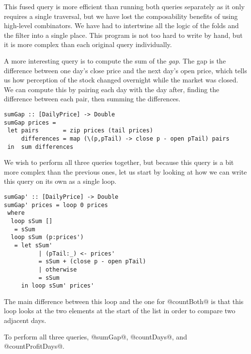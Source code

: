 This fused query is more efficient than running both queries separately as it only requires a single traversal, but we have lost the composability benefits of using high-level combinators.
We have had to intertwine all the logic of the folds and the filter into a single place.
This program is not too hard to write by hand, but it is more complex than each original query individually.

A more interesting query is to compute the sum of the \emph{gap}.
The gap is the difference between one day's close price and the next day's open price, which tells us how perception of the stock changed overnight while the market was closed.
We can compute this by pairing each day with the day after, finding the difference between each pair, then summing the differences.

\begin{lstlisting}
sumGap :: [DailyPrice] -> Double
sumGap prices =
 let pairs       = zip prices (tail prices)
     differences = map (\(p,pTail) -> close p - open pTail) pairs
 in  sum differences
\end{lstlisting}

We wish to perform all three queries together, but because this query is a bit more complex than the previous ones, let us start by looking at how we can write this query on its own as a single loop.

\begin{lstlisting}
sumGap' :: [DailyPrice] -> Double
sumGap' prices = loop 0 prices
 where
  loop sSum []
   = sSum
  loop sSum (p:prices')
   = let sSum'
          | (pTail:_) <- prices'
          = sSum + (close p - open pTail)
          | otherwise
          = sSum
     in loop sSum' prices'
\end{lstlisting}


The main difference between this loop and the one for @countBoth@ is that this loop looks at the two elements at the start of the list in order to compare two adjacent days.

To perform all three queries, @sumGap@, @countDays@, and @countProfitDays@.

